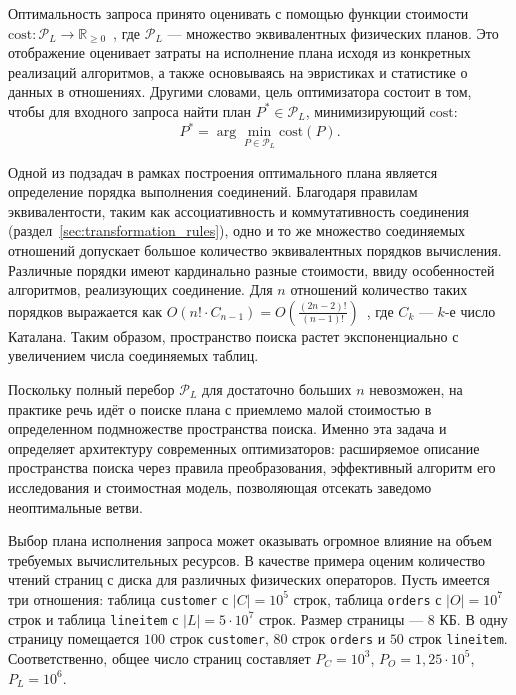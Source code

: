 \documentclass[fontsize=14pt, russian]{scrartcl}
\begin{document}
Оптимальность запроса принято оценивать с помощью функции стоимости
\(\mathrm{cost} \colon \mathcal{P}_L \to \mathbb{R}_{\ge 0}\)~\cite{Selinger1979},
где \(\mathcal{P}_{L}\) --- множество эквивалентных физических планов. Это
отображение оценивает затраты на исполнение плана исходя из конкретных
реализаций алгоритмов, а также основываясь на эвристиках и статистике о данных в
отношениях. Другими словами, цель оптимизатора состоит в том, чтобы для входного
запроса найти план \(P^* \in \mathcal{P}_L\), минимизирующий \(\mathrm{cost}\):
\[
  P^* = \arg\min_{P \in \mathcal{P}_L} \mathrm{cost}(P).
\]

Одной из подзадач в рамках построения оптимального плана является определение
порядка выполнения соединений. Благодаря правилам эквивалентости, таким как
ассоциативность и коммутативность соединения
(раздел~\ref{sec:transformation_rules}), одно и то же множество соединяемых
отношений допускает большое количество эквивалентных порядков вычисления.
Различные порядки имеют кардинально разные стоимости, ввиду особенностей
алгоритмов, реализующих соединение. Для \(n\) отношений количество таких
порядков выражается как
\(O(n! \cdot C_{n-1}) = O(\frac{(2n-2)!}{(n-1)!})\)~\cite{IntroToTheJoinOrderingProblem},
где \(C_k\) --- \(k\)-е число Каталана. Таким образом, пространство поиска
растет экспоненциально с увеличением числа соединяемых таблиц.

Поскольку полный перебор \(\mathcal{P}_L\) для достаточно больших \(n\)
невозможен, на практике речь идёт о поиске плана с приемлемо малой стоимостью в
определенном подмножестве пространства поиска. Именно эта задача и определяет
архитектуру современных оптимизаторов: расширяемое описание пространства поиска
через правила преобразования, эффективный алгоритм его исследования и
стоимостная модель, позволяющая отсекать заведомо неоптимальные ветви.

Выбор плана исполнения запроса может оказывать огромное влияние на объем
требуемых вычислительных ресурсов. В качестве примера оценим количество чтений
страниц с диска для различных физических операторов. Пусть имеется три
отношения: таблица \texttt{customer} с \(|C| = 10^5\) строк, таблица
\texttt{orders} с \(|O| = 10^7\) строк и таблица \texttt{lineitem} с
\(|L| = 5 \cdot 10^7\) строк. Размер страницы --- \(8\) КБ. В одну страницу
помещается \(100\) строк \texttt{customer}, \(80\) строк \texttt{orders} и
\(50\) строк \texttt{lineitem}. Соответственно, общее число страниц составляет
\(P_C = 10^3\), \(P_O = 1{,}25 \cdot 10^5\), \(P_L = 10^6\).
\end{document}
